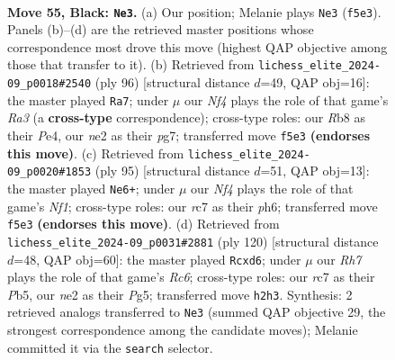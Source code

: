 \documentclass[11pt]{article}
\begin{document}
\clearpage

\begin{figure}[p]\centering
\begin{subfigure}{0.46\textwidth}\centering
\resizebox{\linewidth}{!}{%
\newchessgame
\chessboard[
  setfen={1r6/2R5/3pk3/5n2/6pp/1p6/3RN1Pr/6K1 b - - 1 55},
  showmover=false,
  pgfstyle=straightmove, color=movearrow, markmove={f5-e3}
]}
\caption{}
\end{subfigure}\hfill
\begin{subfigure}{0.46\textwidth}\centering
\resizebox{\linewidth}{!}{%
\newchessgame
\chessboard[
  setfen={3k4/3p2p1/2r5/3R1P2/4PK2/R1P3Pr/8/8 w - - 6 49},
  showmover=false,
  pgfstyle=straightmove, color=movearrow, markmove={a3-a7}
]}
\caption{}
\end{subfigure}
\\[4pt]
\begin{subfigure}{0.46\textwidth}\centering
\resizebox{\linewidth}{!}{%
\newchessgame
\chessboard[
  setfen={5nk1/4r2p/6pP/R7/P2KP3/8/4N3/8 b - - 0 48},
  showmover=false,
  pgfstyle=straightmove, color=movearrow, markmove={f8-e6}
]}
\caption{}
\end{subfigure}\hfill
\begin{subfigure}{0.46\textwidth}\centering
\resizebox{\linewidth}{!}{%
\newchessgame
\chessboard[
  setfen={8/1k6/2Rp2r1/1P4P1/P3p3/1KP5/3R4/5r2 w - - 6 61},
  showmover=false,
  pgfstyle=straightmove, color=movearrow, markmove={c6-d6}
]}
\caption{}
\end{subfigure}
\caption{\textbf{Move 55, Black: \texttt{Ne3}.} (a) Our position; Melanie plays \texttt{Ne3} (\texttt{f5e3}). Panels (b)--(d) are the retrieved master positions whose correspondence most drove this move (highest QAP objective among those that transfer to it). (b) Retrieved from \texttt{lichess\_elite\_2024-09\_p0018\#2540} (ply 96) [structural distance $d$=49, QAP obj=16]: the master played \texttt{Ra7}; under $\mu$ our \emph{Nf4} plays the role of that game's \emph{Ra3} (a \textbf{cross-type} correspondence); cross-type roles: our \emph{R}b8 as their \emph{P}e4, our \emph{n}e2 as their \emph{p}g7; transferred move \texttt{f5e3} \textbf{(endorses this move)}. (c) Retrieved from \texttt{lichess\_elite\_2024-09\_p0020\#1853} (ply 95) [structural distance $d$=51, QAP obj=13]: the master played \texttt{Ne6+}; under $\mu$ our \emph{Nf4} plays the role of that game's \emph{Nf1}; cross-type roles: our \emph{r}c7 as their \emph{p}h6; transferred move \texttt{f5e3} \textbf{(endorses this move)}. (d) Retrieved from \texttt{lichess\_elite\_2024-09\_p0031\#2881} (ply 120) [structural distance $d$=48, QAP obj=60]: the master played \texttt{Rcxd6}; under $\mu$ our \emph{Rh7} plays the role of that game's \emph{Rc6}; cross-type roles: our \emph{r}c7 as their \emph{P}b5, our \emph{n}e2 as their \emph{P}g5; transferred move \texttt{h2h3}. Synthesis: 2 retrieved analogs transferred to \texttt{Ne3} (summed QAP objective 29, the strongest correspondence among the candidate moves); Melanie committed it via the \texttt{search} selector.}
\label{fig:thought-m109}
\end{figure}
\end{document}
